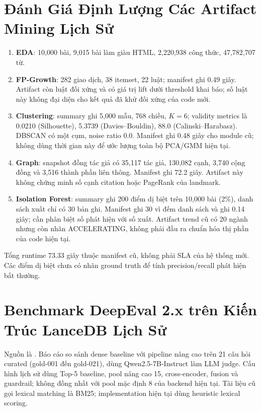 \section{Đánh Giá Định Lượng Các Artifact Mining Lịch Sử}
\begin{enumerate}
\item \textbf{EDA}: 10,000 bài, 9,015 bài làm giàu HTML, 2,220,938 công thức, 47,782,707 từ.
\item \textbf{FP-Growth}: 282 giao dịch, 38 itemset, 22 luật; manifest ghi 0.49 giây. Artifact còn luật đối xứng và có giá trị lift dưới threshold khai báo; số luật này không đại diện cho kết quả đã khử đối xứng của code mới.
\item \textbf{Clustering}: summary ghi 5,000 mẫu, 768 chiều, $K=6$; validity metrics là 0.0210 (Silhouette), 5.3739 (Davies--Bouldin), 88.0 (Calinski--Harabasz). DBSCAN có một cụm, noise ratio 0.0. Manifest ghi 0.48 giây cho module cũ; không dùng thời gian này để ước lượng toàn bộ PCA/GMM hiện tại.
\item \textbf{Graph}: snapshot đồng tác giả có 35,117 tác giả, 130,082 cạnh, 3,740 cộng đồng và 3,516 thành phần liên thông. Manifest ghi 72.2 giây. Artifact này không chứng minh số cạnh citation hoặc PageRank của landmark.
\item \textbf{Isolation Forest}: summary ghi 200 điểm dị biệt trên 10,000 bài (2\%), danh sách xuất chỉ có 30 bản ghi. Manifest ghi 30 vì đếm danh sách và ghi 0.14 giây; cần phân biệt số phát hiện với số xuất. Artifact trend cũ có 20 ngành nhưng còn nhãn ACCELERATING, không phải đầu ra chuẩn hóa thị phần của code hiện tại.
\end{enumerate}
Tổng runtime 73.33 giây thuộc manifest cũ, không phải SLA của hệ thống mới. Các điểm dị biệt chưa có nhãn ground truth để tính precision/recall phát hiện bất thường.

\section{Benchmark DeepEval 2.x trên Kiến Trúc LanceDB Lịch Sử}
Nguồn là . Báo cáo so sánh dense baseline với pipeline nâng cao trên 21 câu hỏi curated (gold-001 đến gold-021), dùng Qwen2.5-7B-Instruct làm LLM judge. Cấu hình lịch sử dùng Top-5 baseline, pool nâng cao 15, cross-encoder, fusion và guardrail; không đồng nhất với pool mặc định 8 của backend hiện tại. Tài liệu cũ gọi lexical matching là BM25; implementation hiện tại dùng heuristic lexical scoring.

